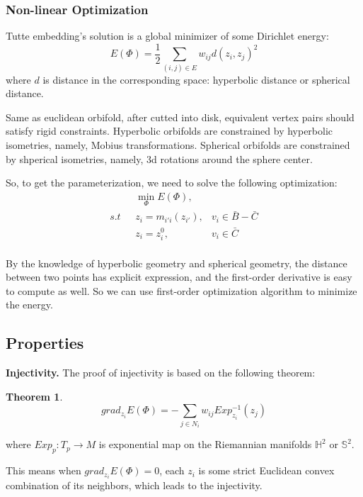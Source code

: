 \documentclass[fleqn,10pt]{wlscirep}
\newtheorem{theorem}{Theorem}[section]
\begin{document}
\subsubsection{Non-linear Optimization}

Tutte embedding's solution is a global minimizer of some Dirichlet energy:
\begin{equation}
E(\Phi) = \frac{1}{2}\sum_{(i,j)\in E} w_{ij} d(z_i, z_j)^2
\end{equation}
where $d$ is distance in the corresponding space: hyperbolic distance or spherical distance.

Same as euclidean orbifold, after cutted into disk, equivalent vertex pairs should satisfy rigid constraints. Hyperbolic orbifolds are constrained by hyperbolic isometries, namely, Mobius transformations. Spherical orbifolds are constrained by shperical isometries, namely, 3d rotations around the sphere center.

So, to get the parameterization, we need to solve the following optimization:
\begin{equation}
\begin{split}
&\min_{\Phi} E(\Phi),&\\
s.t \ \ \ &z_i = m_{i'i}(z_{i'}), &v_i \in \bar{B} - \bar{C}\\
 &z_i = z_i^0, &v_i \in \bar{C}\\
\end{split}
\end{equation}

By the knowledge of hyperbolic geometry and spherical geometry, the distance between two points has explicit expression, and the first-order derivative is easy to compute as well. So we can use first-order optimization algorithm to minimize the energy.

\subsection{Properties}

\textbf{Injectivity.}
The proof of injectivity is based on the following theorem:
\begin{theorem}
$$grad_{z_i}E(\Phi) = -\sum_{j\in N_i} w_{ij} Exp^{-1}_{z_i}(z_j)$$
\end{theorem}
where $Exp_{p}: T_p \rightarrow M$ is exponential map on the Riemannian manifolds $\mathbb{H}^2$ or $\mathbb{S}^2$.

This means when $grad_{z_i}E(\Phi) = 0$, each $z_i$ is some strict Euclidean convex combination of its neighbors, which leads to the injectivity.
\end{document}
